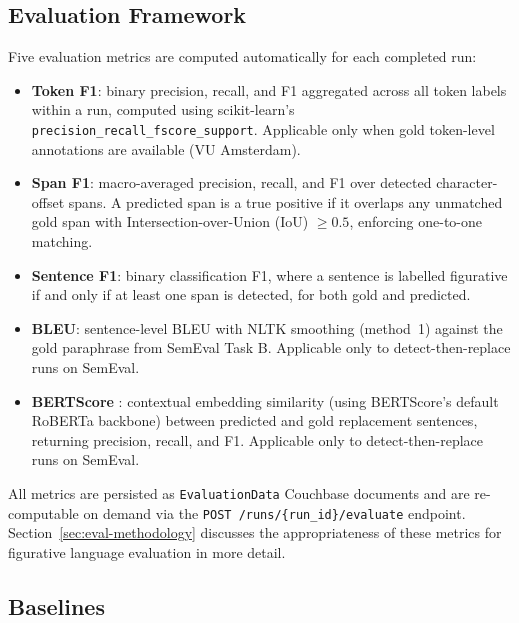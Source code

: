 \subsection{Evaluation Framework}
\label{sec:eval-framework}

Five evaluation metrics are computed automatically for each completed run:
\begin{itemize}
    \item \textbf{Token F1}: binary precision, recall, and F1 aggregated across all token labels within a run, computed using scikit-learn's \texttt{precision\_recall\_fscore\_support}. Applicable only when gold token-level annotations are available (VU Amsterdam).
    \item \textbf{Span F1}: macro-averaged precision, recall, and F1 over detected character-offset spans. A predicted span is a true positive if it overlaps any unmatched gold span with Intersection-over-Union (IoU) $\geq 0.5$, enforcing one-to-one matching.
    \item \textbf{Sentence F1}: binary classification F1, where a sentence is labelled figurative if and only if at least one span is detected, for both gold and predicted.
    \item \textbf{BLEU}: sentence-level BLEU with NLTK smoothing (method~1) against the gold paraphrase from SemEval Task B. Applicable only to detect-then-replace runs on SemEval.
    \item \textbf{BERTScore} \cite{zhang2020bertscore}: contextual embedding similarity (using BERTScore's default RoBERTa backbone) between predicted and gold replacement sentences, returning precision, recall, and F1. Applicable only to detect-then-replace runs on SemEval.
\end{itemize}

All metrics are persisted as \texttt{EvaluationData} Couchbase documents and are re-computable on demand via the \texttt{POST /runs/\{run\_id\}/evaluate} endpoint. Section~\ref{sec:eval-methodology} discusses the appropriateness of these metrics for figurative language evaluation in more detail.

\subsection{Baselines}
\label{sec:baselines}

